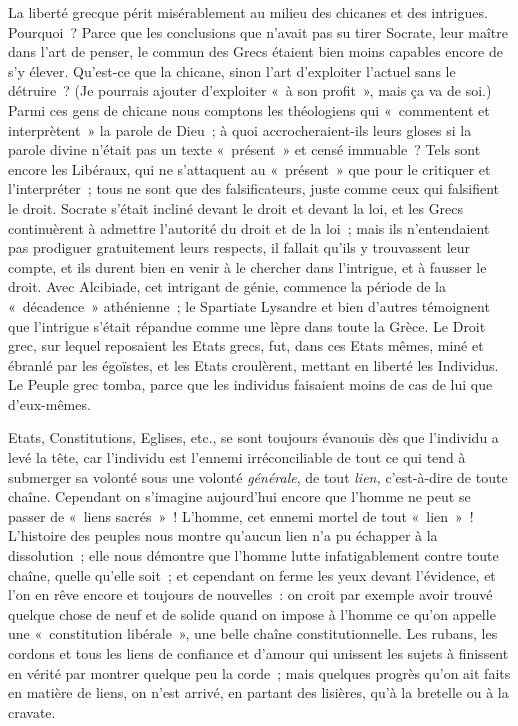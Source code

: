 \documentclass[french,twoside]{book} %
\begin{document}
La liberté grecque périt misérablement au milieu des chicanes et des intrigues. Pourquoi ? Parce que les conclusions que n’avait pas su tirer Socrate, leur maître dans l’art de penser, le commun des Grecs étaient bien moins capables encore de s’y élever. Qu’est-ce que la chicane, sinon l’art d’exploiter l’actuel sans le détruire ? (Je pourrais ajouter d’exploiter « à son profit », mais ça va de soi.) Parmi ces gens de chicane nous comptons les théologiens qui « commentent et interprètent » la parole de Dieu ; à quoi accrocheraient-ils leurs gloses si la parole divine n’était pas un texte « présent » et censé immuable ? Tels sont encore les Libéraux, qui ne s’attaquent au « présent » que pour le critiquer et l’interpréter ; tous ne sont que des falsificateurs, juste comme ceux qui falsifient le droit. Socrate s’était incliné devant le droit et devant la loi, et les Grecs continuèrent  à admettre l’autorité du droit et de la loi ; mais ils n’entendaient pas prodiguer gratuitement leurs respects, il fallait qu’ils y trouvassent leur compte, et ils durent bien en venir à le chercher dans l’intrigue, et à fausser le droit. Avec Alcibiade, cet intrigant de génie, commence la période de la « décadence » athénienne ; le Spartiate Lysandre et bien d’autres témoignent que l’intrigue s’était répandue comme une lèpre dans toute la Grèce. Le Droit grec, sur lequel reposaient les Etats grecs, fut, dans ces Etats mêmes, miné et ébranlé par les égoïstes, et les Etats croulèrent, mettant en liberté les Individus. Le Peuple grec tomba, parce que les individus faisaient moins de cas de lui que d’eux-mêmes.\par
Etats, Constitutions, Eglises, etc., se sont toujours évanouis dès que l’individu a levé la tête, car l’individu est l’ennemi irréconciliable de tout ce qui tend à submerger sa volonté sous une volonté \emph{générale}, de tout \emph{lien,} c’est-à-dire de toute chaîne. Cependant on s’imagine aujourd’hui encore que l’homme ne peut se passer de « liens sacrés » ! L’homme, cet ennemi mortel de tout « lien » ! L’histoire des peuples nous montre qu’aucun lien n’a pu échapper à la dissolution ; elle nous démontre que l’homme lutte infatigablement contre toute chaîne, quelle qu’elle soit ; et cependant on ferme les yeux devant l’évidence, et l’on en rêve encore et toujours de nouvelles : on croit par exemple avoir trouvé quelque chose de neuf et de solide quand on impose à l’homme ce qu’on appelle une « constitution libérale », une belle chaîne constitutionnelle. Les rubans, les cordons et tous les liens de confiance et d’amour qui unissent les sujets à finissent en vérité par montrer quelque peu la corde ; mais quelques progrès qu’on ait faits en matière de liens, on n’est arrivé, en partant des lisières, qu’à la bretelle ou à la cravate.\par
\end{document}
